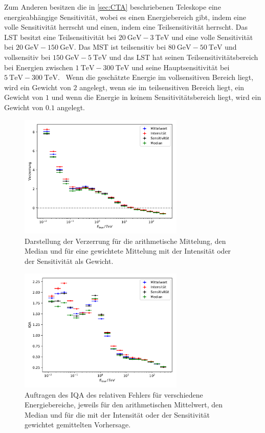 Zum Anderen besitzen die in \autoref{sec:CTA} beschriebenen Teleskope eine energieabhängige Sensitivität, wobei
es einen Energiebereich gibt, indem eine volle Sensitivität herrscht und einen, indem eine Teilsensitivität
herrscht.
Das LST besitzt eine Teilsensitivität bei $\SI{20}{\giga\eV}-\SI{3}{\tera\eV}$ und eine volle Sensitivität bei
$\SI{20}{\giga\eV}-\SI{150}{\giga\eV}$.
Das MST ist teilsensitiv bei $\SI{80}{\giga\eV}-\SI{50}{\tera\eV}$ und vollsensitiv bei $\SI{150}{\giga\eV}-\SI{5}{\tera\eV}$
und das LST hat seinen Teilsensitivitätsbereich bei Energien zwischen $\SI{1}{\tera\eV}-\SI{300}{\tera\eV}$ und seine
Hauptsensitivität bei $\SI{5}{\tera\eV}-\SI{300}{\tera\eV}$.~\cite{CTA_tec}
Wenn die geschätzte Energie im vollsensitiven Bereich liegt, wird ein Gewicht von $2$ angelegt, wenn sie im
teilsensitiven Bereich liegt, ein Gewicht von $1$ und wenn die Energie in keinem Sensitivitätsbereich liegt,
wird ein Gewicht von $0.1$ angelegt.
\begin{figure}
  \includegraphics[width=0.7\textwidth]{Plots/RF_weights_bias.pdf}
  \centering
  \caption{Darstellung der Verzerrung für die arithmetische Mittelung, den Median und für eine gewichtete Mittelung mit der Intensität
            oder der Sensitivität als Gewicht.}
  \label{abb:w_bias}
\end{figure}
\begin{figure}
  \includegraphics[width=0.7\textwidth]{Plots/RF_weights_resolution.pdf}
  \centering
  \caption{Auftragen des IQA des relativen Fehlers für verschiedene Energiebereiche, jeweils für den arithmetischen Mittelwert, den Median und
            für die mit der Intensität oder der Sensitivität gewichtet gemittelten Vorhersage.}
  \label{abb:w_IQA}
\end{figure}


